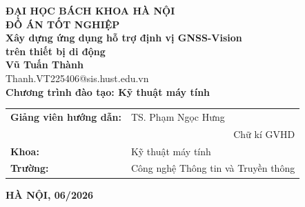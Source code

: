 \documentclass[DoAn.tex]{subfiles}
\begin{document}
\begin{titlepage}
\thispagestyle{empty}
\begin{center}

{\textbf{\large{ĐẠI HỌC BÁCH KHOA HÀ NỘI}}}\\[4cm]

{\textbf{\huge{ĐỒ ÁN TỐT NGHIỆP}}}\\[1cm]
{\textbf{\Large{Xây dựng ứng dụng hỗ trợ định vị GNSS-Vision\\ trên thiết bị di động}}}\\[1cm]

{\textbf{\large{Vũ Tuấn Thành}}}\\
{\large{Thanh.VT225406@sis.hust.edu.vn}}\\[0.5cm]

{\textbf{\large{Chương trình đào tạo: Kỹ thuật máy tính}}}\\[1.8cm]

\begin{tabular}{ll}
\multicolumn{1}{c}{\textbf{Giảng viên hướng dẫn:}} & TS. Phạm Ngọc Hưng \hspace{0.5cm} \underline{\hspace{3cm}} \\[0.5cm]
  & \multicolumn{1}{r}{Chữ kí GVHD} \\[0.5cm]
\textbf{Khoa:} & Kỹ thuật máy tính \\[0.5cm]
\textbf{Trường:} & Công nghệ Thông tin và Truyền thông
\end{tabular}

\vfill
{\textbf{HÀ NỘI, 06/2026}}
\end{center}

\end{titlepage}
\end{document}

